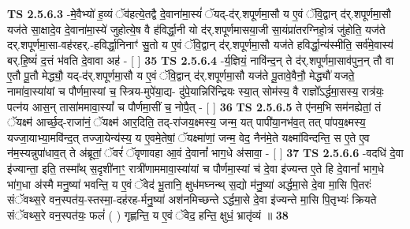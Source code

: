 \documentclass[17pt]{extarticle}
\begin{document}
                  \newline
                                \textbf{ TS 2.5.6.3} \newline
                  -मे॒वैभ्यो॑ ह॒व्यं ॅव॑हत्ये॒तद्वै दे॒वाना॑मा॒स्यं॑ ॅयद्-द॑र्.शपूर्णमा॒सौ य ए॒वं ॅवि॒द्वान् द॑र्.शपूर्णमा॒सौ यज॑ते सा॒क्षादे॒व दे॒वाना॑मा॒स्ये॑ जुहोत्ये॒ष वै ह॑विर्द्धा॒नी यो द॑र्.शपूर्णमासया॒जी सा॒यंप्रा॑तरग्निहो॒त्रं जु॑होति॒ यज॑ते दर्.शपूर्णमा॒सा-वह॑रहर्.-हविर्द्धा॒निनाꣳ॑ सु॒तो य ए॒वं ॅवि॒द्वान् द॑र्.शपूर्णमा॒सौ यज॑ते हविर्द्धा॒न्य॑स्मीति॒ सर्व॑मे॒वास्य॑ बर्.हि॒ष्यं॑ द॒त्तं भ॑वति दे॒वावा अह॑ - [  ] \textbf{  35} \newline
                  \newline
                                \textbf{ TS 2.5.6.4} \newline
                  -र्य॒ज्ञियं॒ नावि॑न्द॒न् ते द॑र्.शपूर्णमा॒साव॑पुन॒न् तौ वा ए॒तौ पू॒तौ मेद्ध्यौ॒ यद्-द॑र्.शपूर्णमा॒सौ य ए॒वं ॅवि॒द्वान् द॑र्.शपूर्णमा॒सौ यज॑ते पू॒तावे॒वैनौ॒ मेद्ध्यौ॑ यजते॒ नामा॑वा॒स्या॑यां च पौर्णमा॒स्यां च॒ स्त्रिय-मुपे॑या॒द्य- दु॑पे॒यान्निरि॑न्द्रियः स्या॒त् सोम॑स्य॒ वै राज्ञो᳚ऽर्द्धमा॒सस्य॒ रात्र॑यः॒ पत्न॑य आस॒न् तासा॑ममावा॒स्यां᳚ च पौर्णमा॒सीं च॒ नोपै॒त् - [  ] \textbf{  36} \newline
                  \newline
                                \textbf{ TS 2.5.6.5} \newline
                  ते ए॑नम॒भि सम॑नह्येतां॒ तं ॅयक्ष्म॑ आर्च्छ॒द्-राजा॑नं॒ ॅयक्ष्म॑ आर॒दिति॒ तद्-रा॑जय॒क्ष्मस्य॒ जन्म॒ यत् पापी॑या॒नभ॑व॒त् तत् पा॑पय॒क्ष्मस्य॒ यज्जा॒याभ्या॒मवि॑न्द॒त् तज्जा॒येन्य॑स्य॒ य ए॒वमे॒तेषां॒ ॅयक्ष्मा॑णां॒ जन्म॒ वेद॒ नैन॑मे॒ते यक्ष्मा॑विन्दन्ति॒ स ए॒ते ए॒व न॑म॒स्यन्नुपा॑धाव॒त् ते अ॑ब्रूतां॒ ॅवरं॑ ॅवृणावहा आ॒वं दे॒वानां᳚ भाग॒धे अ॑सावा॒ - [  ] \textbf{  37} \newline
                  \newline
                                \textbf{ TS 2.5.6.6} \newline
                  -वदधि॑ दे॒वा इ॑ज्यान्ता॒ इति॒ तस्मा᳚थ् स॒दृशी॑नाꣳ॒॒ रात्री॑णाममावा॒स्या॑यां च पौर्णमा॒स्यां च॑ दे॒वा इ॑ज्यन्त ए॒ते हि दे॒वानां᳚ भाग॒धे भा॑ग॒धा अ॑स्मै मनु॒ष्या॑ भवन्ति॒ य ए॒वं ॅवेद॑ भू॒तानि॒ क्षुध॑मघ्नन्थ् स॒द्यो म॑नु॒ष्या॑ अर्द्धमा॒से दे॒वा मा॒सि पि॒तरः॑ संॅवथ्स॒रे वन॒स्पत॑य॒-स्तस्मा॒-दह॑रह-र्मनु॒ष्या॑ अश॑नमिच्छन्ते ऽर्द्धमा॒से दे॒वा इ॑ज्यन्ते मा॒सि पि॒तृभ्यः॑ क्रियते संॅवथ्स॒रे वन॒स्पत॑यः॒ फलं॑ ( ) गृह्णन्ति॒ य ए॒वं ॅवेद॒ हन्ति॒ क्षुधं॒ भ्रातृ॑व्यं ॥ \textbf{  38 } \newline
                  \newline
\end{document}
